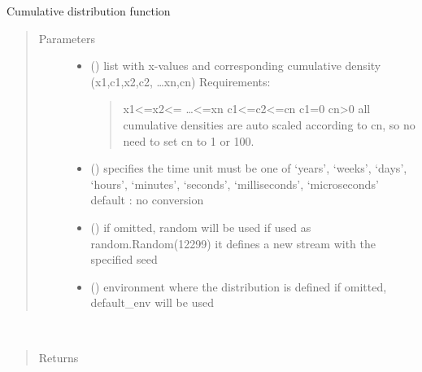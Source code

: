 \documentclass[letterpaper,10pt,english]{sphinxmanual}
\begin{document}

\begin{fulllineitems}
\label{\detokenize{Reference:salabim.Cdf}}
Cumulative distribution function
\begin{quote}\begin{description}
\item[{Parameters}] \leavevmode\begin{itemize}
\item {} 
 () \textendash{} 
list with x-values and corresponding cumulative density
(x1,c1,x2,c2, …xn,cn) 
Requirements:
\begin{quote}

x1\textless{}=x2\textless{}= …\textless{}=xn 
c1\textless{}=c2\textless{}=cn 
c1=0 
cn\textgreater{}0 
all cumulative densities are auto scaled according to cn,
so no need to set cn to 1 or 100.
\end{quote}


\item {} 
 () \textendash{} specifies the time unit 
must be one of ‘years’, ‘weeks’, ‘days’, ‘hours’, ‘minutes’, ‘seconds’, ‘milliseconds’, ‘microseconds’ 
default : no conversion 

\item {} 
 () \textendash{} if omitted, random will be used 
if used as random.Random(12299)
it defines a new stream with the specified seed

\item {} 
 ({\hyperref[\detokenize{Reference:salabim.Environment}]{}}) \textendash{} environment where the distribution is defined 
if omitted, default\_env will be used

\end{itemize}

\end{description}\end{quote}

\begin{fulllineitems}
\label{\detokenize{Reference:salabim.Cdf.mean}}~\begin{quote}\begin{description}
\item[{Returns}] \leavevmode
{}


\end{description}
\end{quote}
\end{fulllineitems}
\end{fulllineitems}
\end{document}
